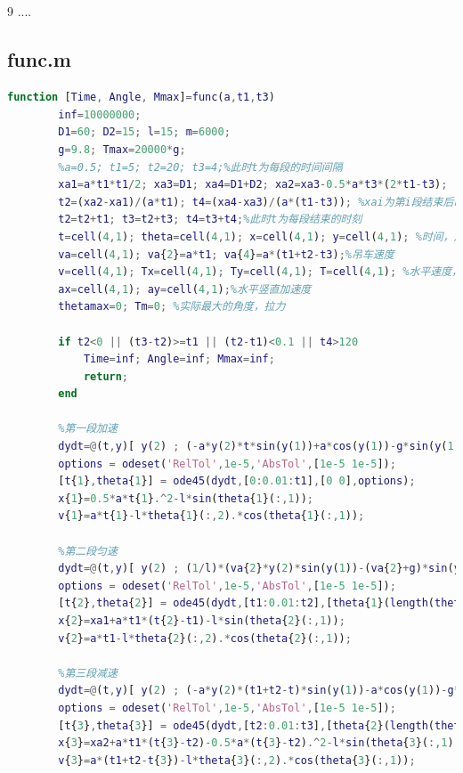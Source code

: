 \documentclass[withoutpreface,bwprint]{cumcmthesis} %
\begin{document}
\subsection{}
\begin{thebibliography}{9}%
     ....
\end{thebibliography}
\begin{appendices}
    \section{func.m}

    \begin{lstlisting}[language=matlab]
        function [Time, Angle, Mmax]=func(a,t1,t3)
        inf=10000000;
        D1=60; D2=15; l=15; m=6000;
        g=9.8; Tmax=20000*g;
        %a=0.5; t1=5; t2=20; t3=4;%此时t为每段的时间间隔
        xa1=a*t1*t1/2; xa3=D1; xa4=D1+D2; xa2=xa3-0.5*a*t3*(2*t1-t3);
        t2=(xa2-xa1)/(a*t1); t4=(xa4-xa3)/(a*(t1-t3)); %xai为第i段结束后吊车的位移
        t2=t2+t1; t3=t2+t3; t4=t3+t4;%此时t为每段结束的时刻
        t=cell(4,1); theta=cell(4,1); x=cell(4,1); y=cell(4,1); %时间，角度，横纵坐标
        va=cell(4,1); va{2}=a*t1; va{4}=a*(t1+t2-t3);%吊车速度
        v=cell(4,1); Tx=cell(4,1); Ty=cell(4,1); T=cell(4,1); %水平速度，拉力,
        ax=cell(4,1); ay=cell(4,1);%水平竖直加速度
        thetamax=0; Tm=0; %实际最大的角度，拉力
        
        if t2<0 || (t3-t2)>=t1 || (t2-t1)<0.1 || t4>120
            Time=inf; Angle=inf; Mmax=inf;
            return;
        end
        
        %第一段加速
        dydt=@(t,y)[ y(2) ; (-a*y(2)*t*sin(y(1))+a*cos(y(1))-g*sin(y(1)))/l ];
        options = odeset('RelTol',1e-5,'AbsTol',[1e-5 1e-5]);
        [t{1},theta{1}] = ode45(dydt,[0:0.01:t1],[0 0],options);
        x{1}=0.5*a*t{1}.^2-l*sin(theta{1}(:,1));
        v{1}=a*t{1}-l*theta{1}(:,2).*cos(theta{1}(:,1));
        
        %第二段匀速
        dydt=@(t,y)[ y(2) ; (1/l)*(va{2}*y(2)*sin(y(1))-(va{2}+g)*sin(y(1))) ];
        options = odeset('RelTol',1e-5,'AbsTol',[1e-5 1e-5]);
        [t{2},theta{2}] = ode45(dydt,[t1:0.01:t2],[theta{1}(length(theta{1}(:,1)),1) theta{1}(length(theta{1}(:,2)),2)],options);
        x{2}=xa1+a*t1*(t{2}-t1)-l*sin(theta{2}(:,1));
        v{2}=a*t1-l*theta{2}(:,2).*cos(theta{2}(:,1));
        
        %第三段减速
        dydt=@(t,y)[ y(2) ; (-a*y(2)*(t1+t2-t)*sin(y(1))-a*cos(y(1))-g*sin(y(1)))/l ];
        options = odeset('RelTol',1e-5,'AbsTol',[1e-5 1e-5]);
        [t{3},theta{3}] = ode45(dydt,[t2:0.01:t3],[theta{2}(length(theta{2}(:,1)),1) theta{2}(length(theta{2}(:,2)),2)],options);
        x{3}=xa2+a*t1*(t{3}-t2)-0.5*a*(t{3}-t2).^2-l*sin(theta{3}(:,1));
        v{3}=a*(t1+t2-t{3})-l*theta{3}(:,2).*cos(theta{3}(:,1));
        

\end{lstlisting}
\end{appendices}
\end{document}
